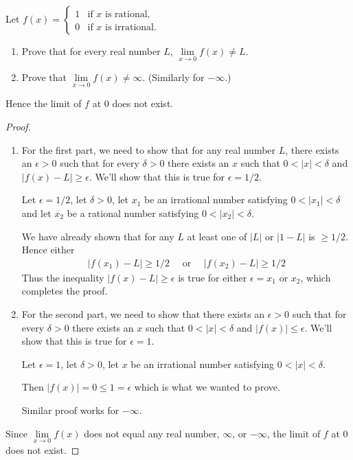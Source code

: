 \begin{exercise*}
  Let $
    f(x) = \begin{cases}
      1 & \mbox{if $x$ is rational,}   \\
      0 & \mbox{if $x$ is irrational.}
    \end{cases}
  $
  \begin{enumerate}
    \item Prove that for every real number $L$, $\lim \limits_{x \rightarrow 0} f(x) \neq L$.
    \item Prove that $\lim \limits_{x \rightarrow 0} f(x) \neq \infty$. (Similarly for $-\infty$.)
  \end{enumerate}
  Hence the limit of $f$ at $0$ does not exist.
\end{exercise*}
\begin{proof}
  \begin{enumerate}
    \item   For the first part, we need to show that for any real number $L$, there exists an $\epsilon > 0$ such that for every $\delta > 0$ there exists an $x$ such that $0 < |x| < \delta$ and $|f(x) - L | \ge \epsilon$. We'll show that this is true for $\epsilon = 1/2$.

    Let $\epsilon = 1/2$, let $\delta > 0$, let $x_1$ be an irrational number satisfying $0 < |x_1| < \delta$ and let $x_2$ be a rational number satisfying $0 < |x_2 | < \delta$.

    We have already shown that for any $L$ at least one of $|L|$ or $|1 - L|$ is $\ge 1/2$. Hence either \begin{align*}
      |f(x_1) - L| \ge 1/2 \quad \mbox{ or } \quad |f(x_2) - L | \ge 1/2
    \end{align*}
    Thus the inequality $|f(x) - L | \ge \epsilon$ is true for either $\epsilon = x_1$ or $x_2$, which completes the proof.

    \item For the second part, we need to show that there exists an $\epsilon > 0$ such that for every $\delta > 0$ there exists an $x$ such that $0 < |x| < \delta$ and $|f(x)| \le \epsilon$. We'll show that this is true for $\epsilon = 1$.

    Let $\epsilon = 1$, let $\delta > 0$, let $x$ be an irrational number satisfying $0 < |x| < \delta$.

    Then $|f(x)| = 0 \le 1 = \epsilon$ which is what we wanted to prove.

    Similar proof works for $-\infty$.\\
  \end{enumerate}
  Since $\lim \limits_{x \rightarrow 0} f(x)$ does not equal any real number, $\infty$, or $-\infty$, the limit of $f$ at 0 does not exist.
\end{proof}
